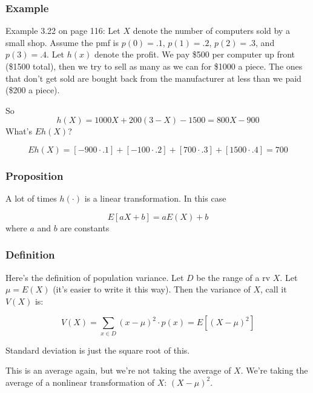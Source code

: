 \documentclass{beamer}
\begin{document}
\begin{frame}
\frametitle{Example}

Example 3.22 on page 116: Let $X$ denote the number of computers sold by a small shop. Assume the pmf is $p(0) = .1$, $p(1) = .2$, $p(2) = .3$, and $p(3) = .4$. Let $h(x)$ denote the profit. We pay \$500 per computer up front (\$1500 total), then we try to sell as many as we can for \$1000 a piece. The ones that don't get sold are bought back from the manufacturer at less than we paid (\$200 a piece).
\newline

So 
\[
h(X) = 1000X + 200(3 - X) - 1500 = 800X - 900
\]
What's $Eh(X)$?
\newline

\[
Eh(X) = [-900 \cdot .1] + [-100\cdot.2] + [700\cdot.3] + [1500\cdot.4] =700
\]
\end{frame}


\begin{frame}
\frametitle{Proposition}

A lot of times $h(\cdot)$ is a linear transformation. In this case

\[
E[aX + b] = aE(X)+b
\]
where $a$ and $b$ are constants


\end{frame}



\begin{frame}
\frametitle{Definition}

Here's the definition of population variance. Let $D$ be the range of a rv $X$. Let $\mu = E(X)$ (it's easier to write it this way). Then the variance of $X$, call it $V(X)$ is:

\[
V(X) = \sum_{x \in D}(x-\mu)^2 \cdot p(x) = E[(X - \mu)^2]
\]

Standard deviation is just the square root of this.
\newline

This is an average again, but we're not taking the average of $X$. We're taking the average of a nonlinear transformation of $X$: $(X-\mu)^2$.


\end{frame}

\end{document}
